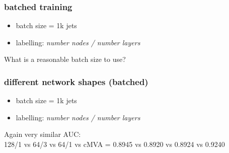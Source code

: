 \documentclass{beamer}
\begin{document}
\begin{frame}
  \frametitle{batched training}
  \begin{itemize}
    \item batch size = 1k jets
    \item labelling: \textsl{number nodes / number layers}
      \end{itemize}

    \begin{figure}[htb]
    \centering
    \end{figure}
    What is a reasonable batch size to use?
\end{frame}

\begin{frame}
  \frametitle{different network shapes (batched)}
  \begin{itemize}
  \item batch size = 1k jets
    \item labelling: \textsl{number nodes / number layers}
  \end{itemize}
  
    \begin{figure}[htb]
    \centering
    \end{figure}
    Again very similar AUC:\\
    128/1 vs 64/3 vs 64/1 vs cMVA = 0.8945 vs 0.8920 vs 0.8924 vs 0.9240
\end{frame}
\end{document}
